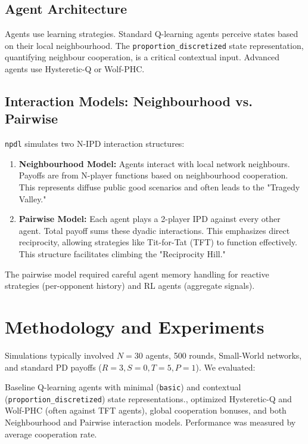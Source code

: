 \documentclass[]{llncs} %
\begin{document}
\subsection{Agent Architecture}
Agents use learning strategies. Standard Q-learning agents perceive states based on their local neighbourhood. The \texttt{proportion_discretized} state representation, quantifying neighbour cooperation, is a critical contextual input. Advanced agents use Hysteretic-Q or Wolf-PHC.

\subsection{Interaction Models: Neighbourhood vs. Pairwise}
\texttt{npdl} simulates two N-IPD interaction structures:
\begin{enumerate}
    \item \textbf{Neighbourhood Model:} Agents interact with local network neighbours. Payoffs are from N-player functions based on neighbourhood cooperation. This represents diffuse public good scenarios and often leads to the "Tragedy Valley."

    \item \textbf{Pairwise Model:} Each agent plays a 2-player IPD against every other agent. Total payoff sums these dyadic interactions. This emphasizes direct reciprocity, allowing strategies like Tit-for-Tat (TFT) to function effectively. This structure facilitates climbing the "Reciprocity Hill."
\end{enumerate}
The pairwise model required careful agent memory handling for reactive strategies (per-opponent history) and RL agents (aggregate signals).

\section{Methodology and Experiments}
\label{sec:methodology}
Simulations typically involved $N=30$ agents, 500 rounds, Small-World networks, and standard PD payoffs ($R=3, S=0, T=5, P=1$).
We evaluated: \item Baseline Q-learning agents with minimal (\texttt{basic}) and contextual (\texttt{proportion_discretized}) state representations., optimized Hysteretic-Q and Wolf-PHC (often against TFT agents), global cooperation bonuses, and both Neighbourhood and Pairwise interaction models. Performance was measured by average cooperation rate.
\end{document}
